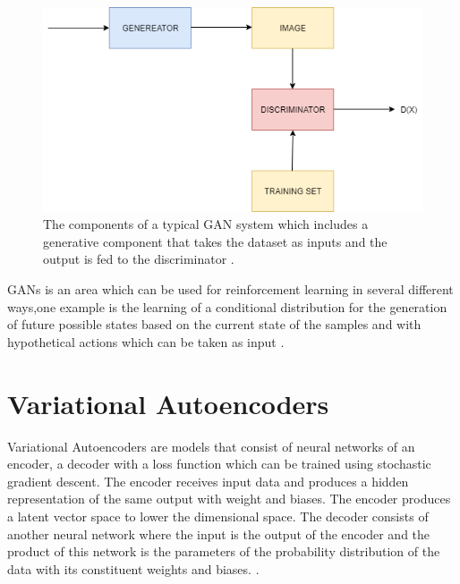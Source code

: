 \begin{figure}
  \centering
  \includegraphics[width=1\linewidth]{graphics/generational_models/gan.png}
  \caption[Caption for GAN]{The components of a typical GAN system which includes a generative component that takes the dataset as inputs and the output is fed to the discriminator \protect \footnotemark.}
  \label{fig:GAN}
\end{figure}

GANs is an area which can be used  for reinforcement learning in several different ways,one example is the learning of a conditional distribution for the generation of future possible states based on the current state of the samples and with hypothetical actions which can be taken as input \citet{goodfellow:2016}.

\pagebreak
\section{Variational Autoencoders}

Variational Autoencoders  are models that consist of neural networks of an encoder, a decoder with a loss function which can be trained using stochastic gradient descent. The encoder receives input data and produces a hidden representation of the same output with weight and biases. The encoder produces a latent vector space to lower the dimensional space.
The decoder consists of another neural network where the input is the output of the encoder and the product of this network is the parameters of the probability distribution of the data with its constituent weights and biases. \citet{doersch:2016}.

